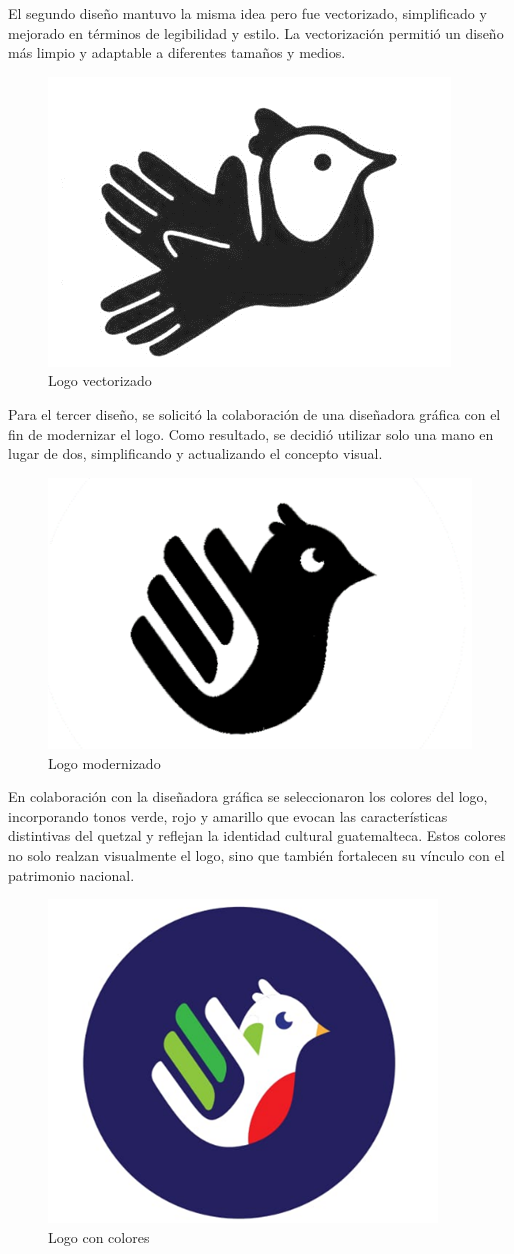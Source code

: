 El segundo diseño mantuvo la misma idea pero fue vectorizado, simplificado y mejorado en términos de legibilidad y estilo. La vectorización permitió un diseño más limpio y adaptable a diferentes tamaños y medios.

\begin{figure} [H]
    \centering
    \includegraphics[width=0.4\linewidth]{figuras/logo2.png}
    \caption{Logo vectorizado}
    \label{fig:enter-label}
\end{figure}


Para el tercer diseño, se solicitó la colaboración de una diseñadora gráfica con el fin de modernizar el logo. Como resultado, se decidió utilizar solo una mano en lugar de dos, simplificando y actualizando el concepto visual.

\begin{figure} [H]
    \centering
    \includegraphics[width=0.4\linewidth]{figuras/logo3.png}
    \caption{Logo modernizado}
    \label{fig:enter-label}
\end{figure}

En colaboración con la diseñadora gráfica se seleccionaron los colores del logo, incorporando tonos verde, rojo y amarillo que evocan las características distintivas del quetzal y reflejan la identidad cultural guatemalteca. Estos colores no solo realzan visualmente el logo, sino que también fortalecen su vínculo con el patrimonio nacional.

\begin{figure} [H]
    \centering
    \includegraphics[width=0.4\linewidth]{figuras/logo4.png}
    \caption{Logo con colores}
    \label{fig:enter-label}
\end{figure}

